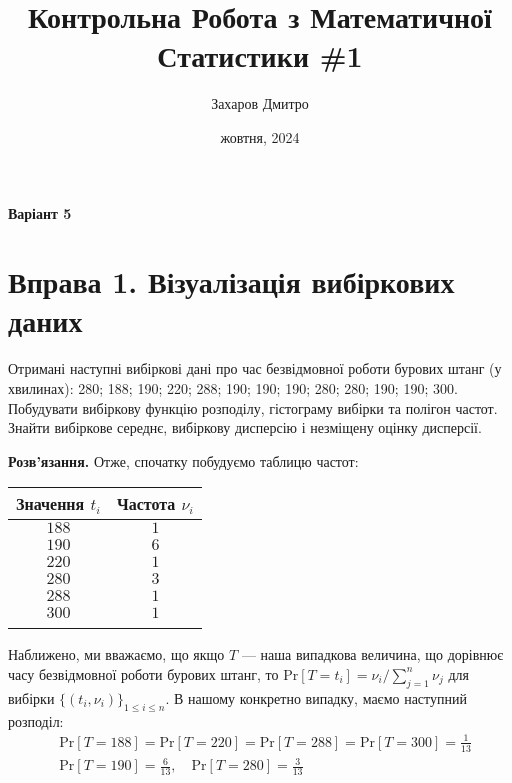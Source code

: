 \documentclass{../hw_template}
\title{\huge\sffamily\bfseries Контрольна Робота з Математичної Статистики \#1}
\author{\Large\sffamily Захаров Дмитро}
\date{\sffamily 26 жовтня, 2024}
\begin{document}
\pagestyle{fancy}

\maketitle

\begin{center}
    \textbf{Варіант 5}
\end{center}

\tableofcontents

\pagebreak

\section{Вправа 1. Візуалізація вибіркових даних}

\begin{problem}
    Отримані наступні вибіркові дані про час безвідмовної роботи бурових 
    штанг (у хвилинах): 280; 188; 190; 220; 288; 190; 190; 190; 280; 280; 190; 190;
300. Побудувати вибіркову функцію розподілу, гістограму вибірки та полігон
частот. Знайти вибіркове середнє, вибіркову дисперсію і незміщену оцінку
дисперсії.
\end{problem}

\textbf{Розв'язання.} Отже, спочатку побудуємо таблицю частот:

\begin{table}[H]
    \centering
    \begin{tabular}{c|c}
        \Xhline{3\arrayrulewidth}
        \textbf{Значення $t_i$} & \textbf{Частота} $\nu_i$ \\
        \hline
        $188$ & $1$ \\
        $190$ & $6$ \\
        $220$ & $1$ \\
        $280$ & $3$ \\
        $288$ & $1$ \\
        $300$ & $1$ \\
        \Xhline{3\arrayrulewidth}
    \end{tabular}
\end{table}

Наближено, ми вважаємо, що якщо $T$ --- наша випадкова величина, що дорівнює часу безвідмовної роботи бурових штанг, то $\text{Pr}[T=t_i] = \nu_i/\sum_{j=1}^n \nu_j$ для вибірки $\{(t_i,\nu_i)\}_{1 \leq i \leq n}$. В нашому конкретно випадку, маємо наступний розподіл:
\begin{align*}
    &\text{Pr}[T=188] = \text{Pr}[T=220] = \text{Pr}[T=288] = \text{Pr}[T=300] = \frac{1}{13}\\
    &\text{Pr}[T=190] = \frac{6}{13}, \quad \text{Pr}[T=280] = \frac{3}{13}
\end{align*}
\end{document}
